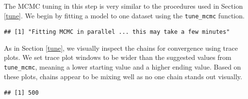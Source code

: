 \documentclass[
]{article}
\newenvironment{Shaded}{\begin{snugshade}}{\end{snugshade}}
\newcommand{\AttributeTok}[1]{\textcolor[rgb]{0.13,0.29,0.53}{#1}}
\newcommand{\DecValTok}[1]{\textcolor[rgb]{0.00,0.00,0.81}{#1}}
\newcommand{\FunctionTok}[1]{\textcolor[rgb]{0.13,0.29,0.53}{\textbf{#1}}}
\newcommand{\NormalTok}[1]{#1}
\newcommand{\OtherTok}[1]{\textcolor[rgb]{0.56,0.35,0.01}{#1}}
\newcommand{\SpecialCharTok}[1]{\textcolor[rgb]{0.81,0.36,0.00}{\textbf{#1}}}
\begin{document}
The MCMC tuning in this step is very similar to the procedures used in Section \ref{tune}. We begin by fitting a model to one dataset using the \texttt{tune\_mcmc} function.

\linespread{1}

\begin{Shaded}
\end{Shaded}

\begin{verbatim}
## [1] "Fitting MCMC in parallel ... this may take a few minutes"
\end{verbatim}

\linespread{1}

As in Section \ref{tune}, we visually inspect the chains for convergence using trace plots. We set trace plot windows to be wider than the suggested values from \texttt{tune\_mcmc}, meaning a lower starting value and a higher ending value. Based on these plots, chains appear to be mixing well as no one chain stands out visually.

\linespread{1}

\begin{Shaded}
\end{Shaded}

\begin{verbatim}
## [1] 500
\end{verbatim}

\begin{Shaded}
\end{Shaded}
\end{document}
